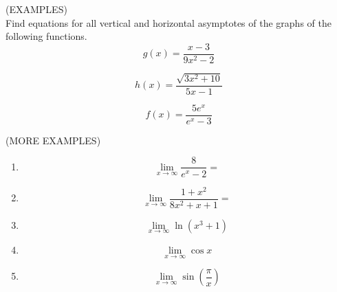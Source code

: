 \documentclass[11pt]{article}
\begin{document}
\vspace{.5in}

(EXAMPLES) \\
Find equations for all vertical and horizontal asymptotes of the graphs of the following functions.
\vspace{.1in}
\begin{displaymath}
g(x) = \frac{x-3}{9x^2-2}
  \end{displaymath}

\vspace{1.7in}

\begin{displaymath}
h(x) = \frac{\sqrt{3x^2+10}}{5x-1}
  \end{displaymath}

\vspace{1.7in}

\begin{displaymath}
f(x) = \frac{5e^x}{e^x-3}
  \end{displaymath}

\vspace{1.5in}


\pagebreak


(MORE EXAMPLES)

\begin{enumerate}
  
\item{
\begin{displaymath}
  \lim_{x\to \infty} \frac{8}{e^x-2} = 
  \end{displaymath}
}

  \vspace{1.5in}

  \item{
\begin{displaymath}
  \lim_{x\to \infty} \frac{1+ x^2}{8x^2+x+1} = 
  \end{displaymath}
}


    \vspace{1.5in}
    
  \item{
\begin{displaymath}
  \lim_{x\to \infty} \ln{(x^3+1)}
  \end{displaymath}

    \vspace{1.5in}

  }


      \item{
\begin{displaymath}
  \lim_{x\to \infty} \cos{x}
  \end{displaymath}

\vspace{1in}

  }

              \item{
\begin{displaymath}
  \lim_{x\to \infty} \sin{\left(\frac{\pi}{x}\right)}
  \end{displaymath}

\vspace{1in}

  }


  \end{enumerate}
\end{document}
